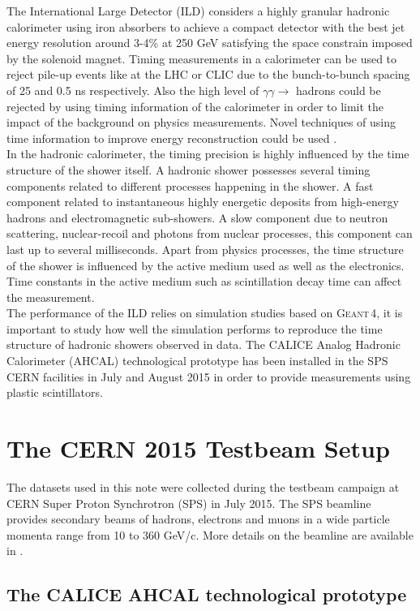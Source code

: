\documentclass[twoside,a4paper,11pt]{article}
\newcommand\geant{\textsc{Geant\,4}\xspace}
\begin{document}
The International Large Detector (ILD) considers a highly granular hadronic calorimeter using iron absorbers to achieve a compact detector with the best jet energy resolution around 3-4\% at 250 GeV satisfying the space constrain imposed by the solenoid magnet. Timing measurements in a calorimeter can be used to reject pile-up events like at the LHC or CLIC due to the bunch-to-bunch spacing of 25 and 0.5 ns respectively. Also the high level of $\gamma\gamma \rightarrow$ hadrons could be rejected by using timing information of the calorimeter in order to limit the impact of the background on physics measurements. Novel techniques of using time information to improve energy reconstruction could be used \cite{IEEE_timing}.\\
In the hadronic calorimeter, the timing precision is highly influenced by the time structure of the shower itself. A hadronic shower possesses several timing components related to different processes happening in the shower. A fast component related to instantaneous highly energetic deposits from high-energy hadrons and electromagnetic sub-showers. A slow component due to neutron scattering, nuclear-recoil and photons from nuclear processes, this component can last up to several milliseconds. Apart from physics processes, the time structure of the shower is influenced by the active medium used as well as the electronics. Time constants in the active medium such as scintillation decay time can affect the measurement.\\
The performance of the ILD relies on simulation studies based on \geant, it is important to study how well the simulation performs to reproduce the time structure of hadronic showers observed in data. The CALICE Analog Hadronic Calorimeter (AHCAL) technological prototype has been installed in the SPS CERN facilities in July and August 2015 in order to provide measurements using plastic scintillators.

\section{The CERN 2015 Testbeam Setup}

The datasets used in this note were collected during the testbeam campaign at CERN Super Proton Synchrotron (SPS) in July 2015. The SPS beamline provides secondary beams of hadrons, electrons and muons in a wide particle momenta range from 10 to 360 GeV/c. More details on the beamline are available in \cite{SPSBeamLine}.

\subsection{The CALICE AHCAL technological prototype}
\end{document}
